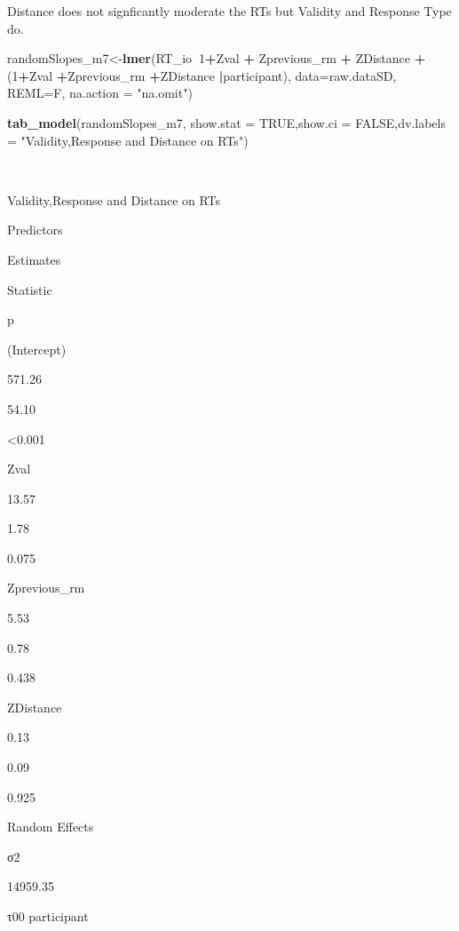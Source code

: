 \documentclass[
]{article}
\newenvironment{Shaded}{\begin{snugshade}}{\end{snugshade}}
\newcommand{\DataTypeTok}[1]{\textcolor[rgb]{0.13,0.29,0.53}{#1}}
\newcommand{\DecValTok}[1]{\textcolor[rgb]{0.00,0.00,0.81}{#1}}
\newcommand{\KeywordTok}[1]{\textcolor[rgb]{0.13,0.29,0.53}{\textbf{#1}}}
\newcommand{\NormalTok}[1]{#1}
\newcommand{\OperatorTok}[1]{\textcolor[rgb]{0.81,0.36,0.00}{\textbf{#1}}}
\newcommand{\OtherTok}[1]{\textcolor[rgb]{0.56,0.35,0.01}{#1}}
\newcommand{\StringTok}[1]{\textcolor[rgb]{0.31,0.60,0.02}{#1}}
\begin{document}
Distance does not signficantly moderate the RTs but Validity and
Response Type do.

\begin{Shaded}
\begin{Highlighting}[]
\NormalTok{randomSlopes_m7<-}\KeywordTok{lmer}\NormalTok{(RT_io}\OperatorTok{~}\DecValTok{1}\OperatorTok{+}\NormalTok{Zval }\OperatorTok{+}\StringTok{ }\NormalTok{Zprevious_rm }\OperatorTok{+}\StringTok{ }\NormalTok{ZDistance }\OperatorTok{+}\StringTok{ }\NormalTok{(}\DecValTok{1}\OperatorTok{+}\NormalTok{Zval }\OperatorTok{+}\NormalTok{Zprevious_rm }\OperatorTok{+}\NormalTok{ZDistance }\OperatorTok{|}\NormalTok{participant), }
                      \DataTypeTok{data=}\NormalTok{raw.dataSD, }
                      \DataTypeTok{REML=}\NormalTok{F,}
                      \DataTypeTok{na.action =} \StringTok{"na.omit"}\NormalTok{)}

\KeywordTok{tab_model}\NormalTok{(randomSlopes_m7, }\DataTypeTok{show.stat =} \OtherTok{TRUE}\NormalTok{,}\DataTypeTok{show.ci =} \OtherTok{FALSE}\NormalTok{,}\DataTypeTok{dv.labels =} \StringTok{"Validity,Response and Distance on RTs"}\NormalTok{)}
\end{Highlighting}
\end{Shaded}

~

Validity,Response and Distance on RTs

Predictors

Estimates

Statistic

p

(Intercept)

571.26

54.10

\textless0.001

Zval

13.57

1.78

0.075

Zprevious\_rm

5.53

0.78

0.438

ZDistance

0.13

0.09

0.925

Random Effects

σ2

14959.35

τ00 participant
\end{document}
